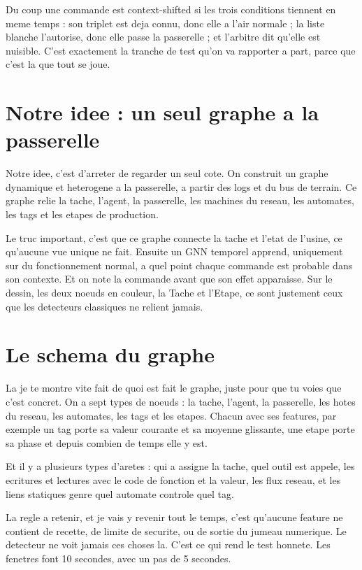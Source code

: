 \documentclass[11pt]{article}
\begin{document}
Du coup une commande est context-shifted si les trois conditions tiennent en meme
temps : son triplet est deja connu, donc elle a l'air normale ; la liste blanche
l'autorise, donc elle passe la passerelle ; et l'arbitre dit qu'elle est nuisible.
C'est exactement la tranche de test qu'on va rapporter a part, parce que c'est la
que tout se joue.

\section{Notre idee : un seul graphe a la passerelle}
Notre idee, c'est d'arreter de regarder un seul cote. On construit un graphe
dynamique et heterogene a la passerelle, a partir des logs et du bus de terrain. Ce
graphe relie la tache, l'agent, la passerelle, les machines du reseau, les
automates, les tags et les etapes de production.

Le truc important, c'est que ce graphe connecte la tache et l'etat de l'usine, ce
qu'aucune vue unique ne fait. Ensuite un GNN temporel apprend, uniquement sur du
fonctionnement normal, a quel point chaque commande est probable dans son contexte.
Et on note la commande avant que son effet apparaisse. Sur le dessin, les deux
noeuds en couleur, la Tache et l'Etape, ce sont justement ceux que les detecteurs
classiques ne relient jamais.

\section{Le schema du graphe}
La je te montre vite fait de quoi est fait le graphe, juste pour que tu voies que
c'est concret. On a sept types de noeuds : la tache, l'agent, la passerelle, les
hotes du reseau, les automates, les tags et les etapes. Chacun avec ses features,
par exemple un tag porte sa valeur courante et sa moyenne glissante, une etape porte
sa phase et depuis combien de temps elle y est.

Et il y a plusieurs types d'aretes : qui a assigne la tache, quel outil est appele,
les ecritures et lectures avec le code de fonction et la valeur, les flux reseau, et
les liens statiques genre quel automate controle quel tag.

La regle a retenir, et je vais y revenir tout le temps, c'est qu'aucune feature ne
contient de recette, de limite de securite, ou de sortie du jumeau numerique. Le
detecteur ne voit jamais ces choses la. C'est ce qui rend le test honnete. Les
fenetres font 10 secondes, avec un pas de 5 secondes.
\end{document}
